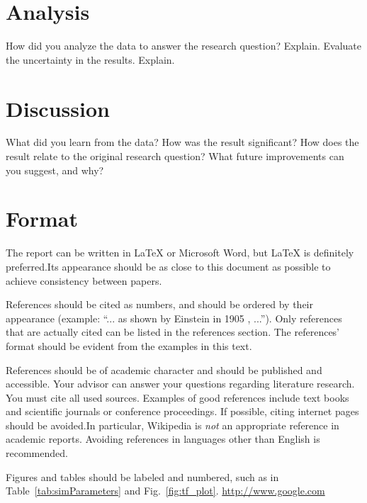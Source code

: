 \documentclass[journal, a4paper]{IEEEtran}
\begin{document}
\section{Analysis}
	How did you analyze the data to answer the research question? Explain. Evaluate the uncertainty in the results. Explain.

\section{Discussion}
	What did you learn from the data? How was the result significant? How does the result relate to the original research question? What 
    future improvements can you suggest, and why?
    
\section{Format}
	The report can be written in \LaTeX{} or Microsoft Word, but \LaTeX{} is definitely preferred.Its appearance should be as close to this document as possible to achieve consistency between papers.

	References should be cited as numbers, and should be ordered by their appearance (example: ``... as shown by Einstein in 1905 \parencite{einstein}, ...'').
	Only references that are actually cited can be listed in the references section.
	The references' format should be evident from the examples in this text.

	References should be of academic character and should be published and accessible.
	Your advisor can answer your questions regarding literature research.
	You must cite all used sources.	Examples of good references include text books and scientific journals or conference proceedings.	If possible, citing internet pages should be avoided.In particular, Wikipedia is \emph{not} an appropriate reference in academic reports.
	Avoiding references in languages other than English is recommended.

	Figures and tables should be labeled and numbered, such as in Table~\ref{tab:simParameters} and Fig.~\ref{fig:tf_plot}. \url{http://www.google.com}
\end{document}
